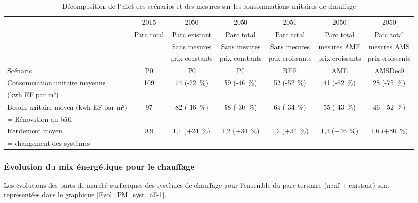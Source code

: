 \documentclass[10.5pt,a4paper]{article}
\begin{document}
{\begin{table}[h] \caption{Décomposition de l'effet des scénarios et des mesures sur les consommations unitaires de chauffage}\label{decomp_conso_u}
\centering
\scriptsize
\begin{tabular}[c]{|l|c|c|c|c|c|c|}
\hline
																						& 	2015  		&	2050 						& 2050 						& 2050 						& 2050 						& 2050				\\
																						& Parc total 	& Parc existant		& Parc total			&	Parc total			& Parc total      & Parc total	\\
																						& 						& Sans mesures		& Sans mesures		& Sans mesures		& mesures AME     & mesures AMS	\\
																						&							& prix constants	& prix constants	& prix croissants	& prix croissants & prix croissants\\ \hline
Scénario 																		& P0 					& P0							&	P0							&	REF							&	AME							& AMSDec0
\\ \hline
Consommation unitaire moyenne 							&		109  			& 74  (-32~\%)		&	59 (-46~\%)			& 52 (-52~\%)			& 41 (-62~\%)			& 28 (-75~\%) \\
 (kwh EF par m²)														&							&									&									&									&									&							\\
Besoin unitaire moyen (kwh EF par m²)				&		97 				& 82 (-16~\%)			& 68 (-30~\%)		  & 64 (-34~\%)			&	55 (-43~\%)			&	46 (-52~\%) \\
= Rénovation du bâti												&							&									&									&									&									&							\\
Rendement moyen															&		0,9 			&  1,1 (+24~\%) 	& 1,2 (+34~\%)  	& 1,2 (+34~\%) 		& 1,3 (+46~\%)		&	1,6 (+80~\%)\\
= changement des systèmes										&							&									&									&									&									&							\\
\hline
\end{tabular}
\end{table}

\clearpage

\subsubsection{Évolution du mix énergétique pour le chauffage}

Les évolutions des parts de marché surfaciques des systèmes de chauffage pour l’ensemble du parc tertiaire (neuf + existant) sont représentées dans le graphique \ref{Evol_PM_syst_all-1}. 

}
\end{document}
